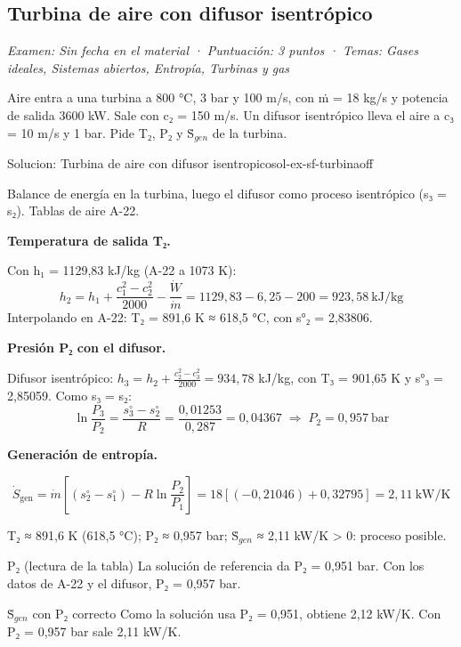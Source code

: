 \documentclass[11pt,a4paper]{article}
\begin{document}
\subsection{Turbina de aire con difusor isentrópico}
\noindent\textit{Examen: Sin fecha en el material · Puntuación: 3 puntos · Temas: Gases ideales, Sistemas abiertos, Entropía, Turbinas y gas}\par\medskip

Aire entra a una turbina a 800 °C, 3 bar y 100 m/s, con ṁ = 18 kg/s y potencia de salida 3600 kW. Sale con c₂ = 150 m/s. Un difusor isentrópico lleva el aire a c₃ = 10 m/s y 1 bar. Pide T₂, P₂ y Ṡ$_{gen}$ de la turbina.

\begin{ocg}{Solucion: Turbina de aire con difusor isentropico}{sol-ex-sf-turbina}{off}
\begin{antesbox}
Balance de energía en la turbina, luego el difusor como proceso isentrópico (s₃ = s₂). Tablas de aire A-22.
\end{antesbox}

\par\medskip\noindent\textbf{Temperatura de salida T₂.}\par
Con h₁ = 1129,83 kJ/kg (A-22 a 1073 K):  \[h_2 = h_1 + \frac{c_1^2 - c_2^2}{2000} - \frac{\dot W}{\dot m} = 1129{,}83 - 6{,}25 - 200 = 923{,}58\ \text{kJ/kg}\]  Interpolando en A-22: T₂ = 891,6 K ≈ 618,5 °C, con s°₂ = 2,83806.

\par\medskip\noindent\textbf{Presión P₂ con el difusor.}\par
Difusor isentrópico:  $h_3 = h_2 + \frac{c_2^2 - c_3^2}{2000} = 934{,}78$  kJ/kg, con T₃ = 901,65 K y s°₃ = 2,85059. Como s₃ = s₂:  \[\ln\frac{P_3}{P_2} = \frac{s^\circ_3 - s^\circ_2}{R} = \frac{0{,}01253}{0{,}287} = 0{,}04367 \;\Rightarrow\; P_2 = 0{,}957\ \text{bar}\]

\par\medskip\noindent\textbf{Generación de entropía.}\par
\[\dot S_{\text{gen}} = \dot m\left[(s^\circ_2 - s^\circ_1) - R\ln\frac{P_2}{P_1}\right] = 18\left[(-0{,}21046) + 0{,}32795\right] = 2{,}11\ \text{kW/K}\]

\begin{resbox}
T₂ ≈ 891,6 K (618,5 °C); P₂ ≈ 0,957 bar; Ṡ$_{gen}$ ≈ 2,11 kW/K > 0: proceso posible.
\end{resbox}

\begin{ojobox}{P₂ (lectura de la tabla)}
La solución de referencia da P₂ = 0,951 bar. Con los datos de A-22 y el difusor, P₂ = 0,957 bar.
\end{ojobox}

\begin{ojobox}{Ṡ$_{gen}$ con P₂ correcto}
Como la solución usa P₂ = 0,951, obtiene 2,12 kW/K. Con P₂ = 0,957 bar sale 2,11 kW/K.
\end{ojobox}

\hspace{0pt}\end{ocg}
\end{document}
